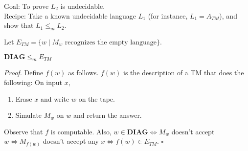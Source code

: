\documentclass[a4paper]{article}
\newenvironment{proof}{\begin{breakbox}\textit{Proof.}}{\hfill$\square$\end{breakbox}}
\newcommand{\nl}{\vspace{0.2cm}\\}
\newcommand{\mf}{\mathbf}
\begin{document}
Goal: To prove $L_2$ is undecidable.\nl

Recipe: Take a known undecidable language $L_1$ (for instance, $L_1 = A_{TM}$), and show that $L_1 \le_m L_2$.\nl

\begin{eg}
    Let $E_{TM} = \{w \mid M_w \text{ recognizes the empty language}\}$.
\end{eg}

\begin{claim}
    $\mf{DIAG} \le_m E_{TM}$
\end{claim}

\begin{proof}
    Define $f(w)$ as follows. $f(w)$ is the description of a TM that does the following:
    On input $x$,
    \begin{enumerate}
        \item Erase $x$ and write $w$ on the tape.
        \item Simulate $M_w$ on $w$ and return the answer.
    \end{enumerate}
    Observe that $f$ is computable. Also, $w \in \mf{DIAG} \iff M_w$ doesn't accept $w \iff M_{f(w)}$ doesn't accept any $x \iff f(w) \in E_{TM}$.
\end{proof}
\end{document}
